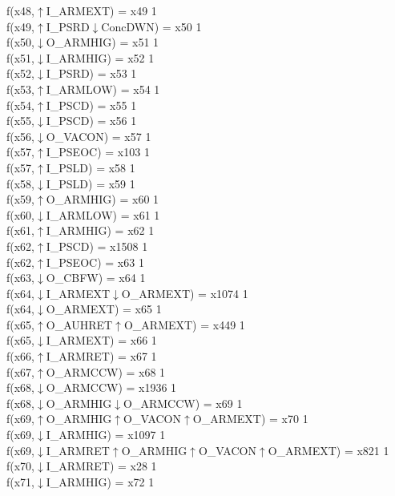 f(x48,$\uparrow$I\_ARMEXT) = x49 {1} \\
f(x49,$\uparrow$I\_PSRD$\downarrow$ConcDWN) = x50 {1} \\
f(x50,$\downarrow$O\_ARMHIG) = x51 {1} \\
f(x51,$\downarrow$I\_ARMHIG) = x52 {1} \\
f(x52,$\downarrow$I\_PSRD) = x53 {1} \\
f(x53,$\uparrow$I\_ARMLOW) = x54 {1} \\
f(x54,$\uparrow$I\_PSCD) = x55 {1} \\
f(x55,$\downarrow$I\_PSCD) = x56 {1} \\
f(x56,$\downarrow$O\_VACON) = x57 {1} \\
f(x57,$\uparrow$I\_PSEOC) = x103 {1} \\
f(x57,$\uparrow$I\_PSLD) = x58 {1} \\
f(x58,$\downarrow$I\_PSLD) = x59 {1} \\
f(x59,$\uparrow$O\_ARMHIG) = x60 {1} \\
f(x60,$\downarrow$I\_ARMLOW) = x61 {1} \\
f(x61,$\uparrow$I\_ARMHIG) = x62 {1} \\
f(x62,$\uparrow$I\_PSCD) = x1508 {1} \\
f(x62,$\uparrow$I\_PSEOC) = x63 {1} \\
f(x63,$\downarrow$O\_CBFW) = x64 {1} \\
f(x64,$\downarrow$I\_ARMEXT$\downarrow$O\_ARMEXT) = x1074 {1} \\
f(x64,$\downarrow$O\_ARMEXT) = x65 {1} \\
f(x65,$\uparrow$O\_AUHRET$\uparrow$O\_ARMEXT) = x449 {1} \\
f(x65,$\downarrow$I\_ARMEXT) = x66 {1} \\
f(x66,$\uparrow$I\_ARMRET) = x67 {1} \\
f(x67,$\uparrow$O\_ARMCCW) = x68 {1} \\
f(x68,$\downarrow$O\_ARMCCW) = x1936 {1} \\
f(x68,$\downarrow$O\_ARMHIG$\downarrow$O\_ARMCCW) = x69 {1} \\
f(x69,$\uparrow$O\_ARMHIG$\uparrow$O\_VACON$\uparrow$O\_ARMEXT) = x70 {1} \\
f(x69,$\downarrow$I\_ARMHIG) = x1097 {1} \\
f(x69,$\downarrow$I\_ARMRET$\uparrow$O\_ARMHIG$\uparrow$O\_VACON$\uparrow$O\_ARMEXT) = x821 {1} \\
f(x70,$\downarrow$I\_ARMRET) = x28 {1} \\
f(x71,$\downarrow$I\_ARMHIG) = x72 {1} \\
